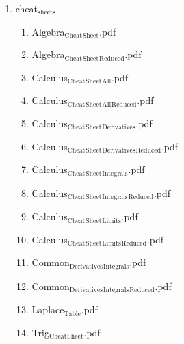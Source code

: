 \documentclass[11pt]{article}
\begin{document}
\begin{enumerate}
\begin{enumerate}
\item cheat$_{\text{sheets}}$
\label{sec-1-1-1-1-29-22-20}
\begin{enumerate}
\item Algebra$_{\text{Cheat}}$$_{\text{Sheet}}$.pdf
\label{sec-1-1-1-1-29-22-20-1}

\item Algebra$_{\text{Cheat}}$$_{\text{Sheet}}$$_{\text{Reduced}}$.pdf
\label{sec-1-1-1-1-29-22-20-2}

\item Calculus$_{\text{Cheat}}$$_{\text{Sheet}}$$_{\text{All}}$.pdf
\label{sec-1-1-1-1-29-22-20-3}

\item Calculus$_{\text{Cheat}}$$_{\text{Sheet}}$$_{\text{All}}$$_{\text{Reduced}}$.pdf
\label{sec-1-1-1-1-29-22-20-4}

\item Calculus$_{\text{Cheat}}$$_{\text{Sheet}}$$_{\text{Derivatives}}$.pdf
\label{sec-1-1-1-1-29-22-20-5}

\item Calculus$_{\text{Cheat}}$$_{\text{Sheet}}$$_{\text{Derivatives}}$$_{\text{Reduced}}$.pdf
\label{sec-1-1-1-1-29-22-20-6}

\item Calculus$_{\text{Cheat}}$$_{\text{Sheet}}$$_{\text{Integrals}}$.pdf
\label{sec-1-1-1-1-29-22-20-7}

\item Calculus$_{\text{Cheat}}$$_{\text{Sheet}}$$_{\text{Integrals}}$$_{\text{Reduced}}$.pdf
\label{sec-1-1-1-1-29-22-20-8}

\item Calculus$_{\text{Cheat}}$$_{\text{Sheet}}$$_{\text{Limits}}$.pdf
\label{sec-1-1-1-1-29-22-20-9}

\item Calculus$_{\text{Cheat}}$$_{\text{Sheet}}$$_{\text{Limits}}$$_{\text{Reduced}}$.pdf
\label{sec-1-1-1-1-29-22-20-10}

\item Common$_{\text{Derivatives}}$$_{\text{Integrals}}$.pdf
\label{sec-1-1-1-1-29-22-20-11}

\item Common$_{\text{Derivatives}}$$_{\text{Integrals}}$$_{\text{Reduced}}$.pdf
\label{sec-1-1-1-1-29-22-20-12}

\item Laplace$_{\text{Table}}$.pdf
\label{sec-1-1-1-1-29-22-20-13}

\item Trig$_{\text{Cheat}}$$_{\text{Sheet}}$.pdf
\label{sec-1-1-1-1-29-22-20-14}


\end{enumerate}
\end{enumerate}
\end{enumerate}
\end{document}
